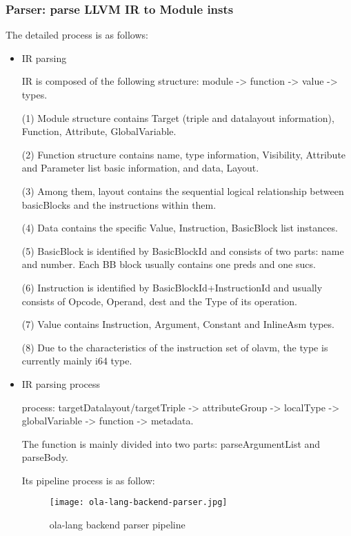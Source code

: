 \subsubsection{Parser: parse LLVM IR to Module insts}

The detailed process is as follows:
    \begin{itemize}
        \item IR parsing

IR is composed of the following structure: module -> function -> value -> types.

(1) Module structure contains Target (triple and datalayout information), Function, Attribute, GlobalVariable.

(2) Function structure contains name, type information, Visibility, Attribute and Parameter list basic information, and data, Layout.

(3) Among them, layout contains the sequential logical relationship between basicBlocks and the instructions within them.

(4) Data contains the specific Value, Instruction, BasicBlock list instances.

(5) BasicBlock is identified by BasicBlockId and consists of two parts: name and number. Each BB block usually contains one preds and one sucs.

(6) Instruction is identified by BasicBlockId+InstructionId and usually consists of Opcode, Operand, dest and the Type of its operation.

(7) Value contains Instruction, Argument, Constant and InlineAsm types.

(8) Due to the characteristics of the instruction set of olavm, the type is currently mainly i64 type.

        \item IR parsing process

process: targetDatalayout/targetTriple -> attributeGroup -> localType -> globalVariable -> function -> metadata.

The function is mainly divided into two parts: parseArgumentList and parseBody.

Its pipeline process is as follow:
\begin{figure}[!htbp]
    \centering
    \texttt{[image: ola-lang-backend-parser.jpg]}
    \caption{ola-lang backend parser pipeline}
    \label{fig:ola-lang-backend-parser}
\end{figure}
\end{itemize}